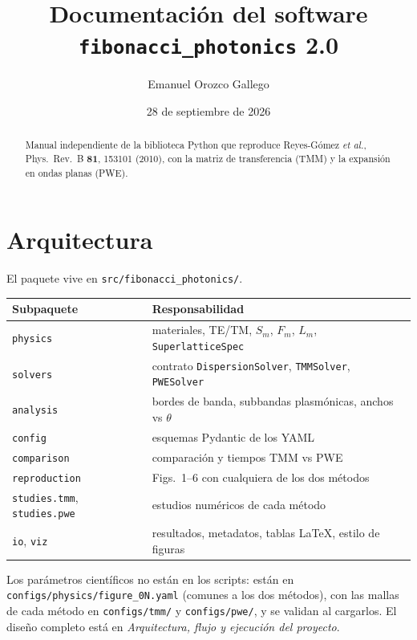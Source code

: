 \documentclass[11pt,a4paper]{article}
\title{Documentación del software \texttt{fibonacci\_photonics} 2.0}
\author{Emanuel Orozco Gallego}
\date{28 de septiembre de 2026}
\begin{document}
\maketitle

\begin{abstract}
Manual independiente de la biblioteca Python que reproduce
Reyes-Gómez \textit{et al.}, Phys.\ Rev.\ B \textbf{81}, 153101 (2010),
con la matriz de transferencia (TMM) y la expansión en ondas planas (PWE).
\end{abstract}

\tableofcontents
\newpage

\section{Arquitectura}

El paquete vive en \texttt{src/fibonacci\_photonics/}.

\begin{center}
\begin{tabular}{ll}
\toprule
Subpaquete & Responsabilidad \\
\midrule
\texttt{physics} & materiales, TE/TM, $S_m$, $F_m$, $L_m$, \texttt{SuperlatticeSpec} \\
\texttt{solvers} & contrato \texttt{DispersionSolver}, \texttt{TMMSolver}, \texttt{PWESolver} \\
\texttt{analysis} & bordes de banda, subbandas plasmónicas, anchos vs $\theta$ \\
\texttt{config} & esquemas Pydantic de los YAML \\
\texttt{comparison} & comparación y tiempos TMM vs PWE \\
\texttt{reproduction} & Figs.~1--6 con cualquiera de los dos métodos \\
\texttt{studies.tmm}, \texttt{studies.pwe} & estudios numéricos de cada método \\
\texttt{io}, \texttt{viz} & resultados, metadatos, tablas LaTeX, estilo de figuras \\
\bottomrule
\end{tabular}
\end{center}

Los parámetros científicos no están en los scripts: están en
\texttt{configs/physics/figure\_0N.yaml} (comunes a los dos métodos), con las
mallas de cada método en \texttt{configs/tmm/} y \texttt{configs/pwe/}, y se
validan al cargarlos. El diseño completo
está en \textit{Arquitectura, flujo y ejecución del proyecto}.
\end{document}
